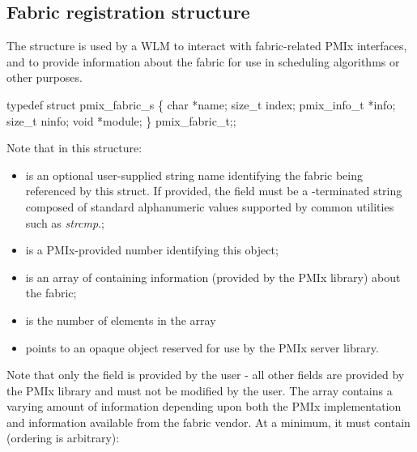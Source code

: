\subsection{Fabric registration structure}

The  structure is used by a \ac{WLM} to interact with fabric-related \ac{PMIx} interfaces, and to provide information about the fabric for use in scheduling algorithms or other purposes.

\cspecificstart
\begin{codepar}
typedef struct pmix_fabric_s \{
    char *name;
    size_t index;
    pmix_info_t *info;
    size_t ninfo;
    void *module;
\} pmix_fabric_t;;
\end{codepar}
\cspecificend

Note that in this structure:

\begin{itemize}
    \item {} is an optional user-supplied string name identifying the fabric being referenced by this struct. If provided, the field must be a -terminated string composed of standard alphanumeric values supported by common utilities such as \textit{strcmp}.;
    \item {} is a \ac{PMIx}-provided number identifying this object;
    \item {} is an array of  containing information (provided by the \ac{PMIx} library) about the fabric;
    \item {} is the number of elements in the  array
    \item {} points to an opaque object reserved for use by the \ac{PMIx} server library.
\end{itemize}

Note that only the  field is provided by the user - all other fields are provided by the \ac{PMIx} library and must not be modified by the user. The  array contains a varying amount of information depending upon both the \ac{PMIx} implementation and information available from the fabric vendor. At a minimum, it must contain (ordering is arbitrary):

\reqattrstart


